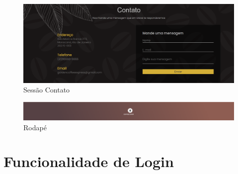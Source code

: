 \begin{figure}[!h]
	\centering
	\includegraphics[width=15cm]{Sessão Contato}
	\caption{Sessão Contato}
\end{figure}

\begin{figure}[!h]
	\centering
	\includegraphics[width=15cm]{Rodapé}
	\caption{Rodapé}
\end{figure}

\section{Funcionalidade de Login}